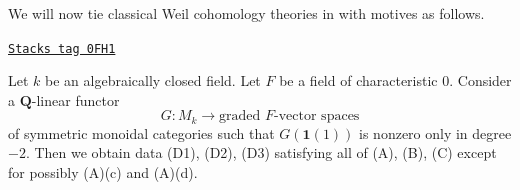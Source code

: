 We will now tie classical Weil cohomology theories in with motives as follows.

\begin{lemma}
\label{weil-lemma-from-functor-to-weil-classical}
\href{https://stacks.math.columbia.edu/tag/0FH1}{\texttt{Stacks tag 0FH1}}

Let $k$ be an algebraically closed field. Let $F$ be a field of
characteristic $0$. Consider a $\mathbf{Q}$-linear functor
$$
G : M_k \longrightarrow \text{graded }F\text{-vector spaces}
$$
of symmetric monoidal categories such that $G(\mathbf{1}(1))$
is nonzero only in degree $-2$. Then we obtain data (D1), (D2), (D3)
satisfying all of (A), (B), (C) except for possibly (A)(c) and (A)(d).
\end{lemma}

